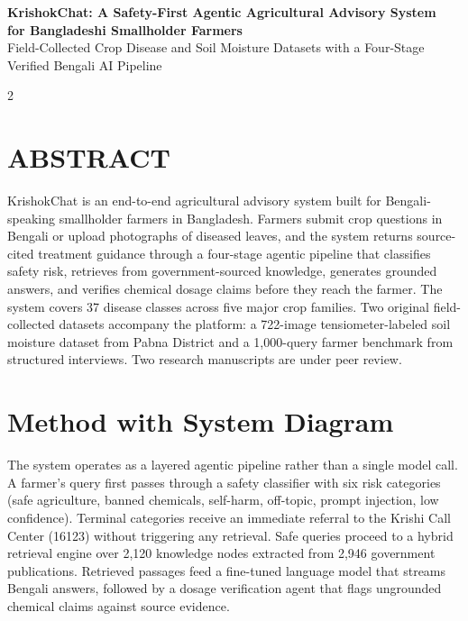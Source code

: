 \documentclass[10pt]{article}
\begin{document}
\begin{center}
{\large\bfseries KrishokChat: A Safety-First Agentic Agricultural Advisory System\\for Bangladeshi Smallholder Farmers}\\[4pt]
{\normalsize Field-Collected Crop Disease and Soil Moisture Datasets with a Four-Stage Verified Bengali AI Pipeline}
\end{center}

\vspace{4pt}

\begin{multicols}{2}

\section*{ABSTRACT}

KrishokChat is an end-to-end agricultural advisory system built for Bengali-speaking smallholder farmers in Bangladesh. Farmers submit crop questions in Bengali or upload photographs of diseased leaves, and the system returns source-cited treatment guidance through a four-stage agentic pipeline that classifies safety risk, retrieves from government-sourced knowledge, generates grounded answers, and verifies chemical dosage claims before they reach the farmer. The system covers 37 disease classes across five major crop families. Two original field-collected datasets accompany the platform: a 722-image tensiometer-labeled soil moisture dataset from Pabna District and a 1,000-query farmer benchmark from structured interviews. Two research manuscripts are under peer review.

\section*{Method with System Diagram}

The system operates as a layered agentic pipeline rather than a single model call. A farmer's query first passes through a safety classifier with six risk categories (safe agriculture, banned chemicals, self-harm, off-topic, prompt injection, low confidence). Terminal categories receive an immediate referral to the Krishi Call Center (16123) without triggering any retrieval. Safe queries proceed to a hybrid retrieval engine over 2,120 knowledge nodes extracted from 2,946 government publications. Retrieved passages feed a fine-tuned language model that streams Bengali answers, followed by a dosage verification agent that flags ungrounded chemical claims against source evidence.


\end{multicols}
\end{document}
